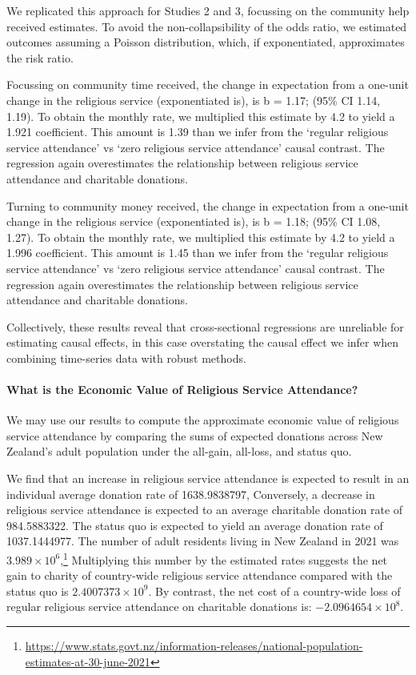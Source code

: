 \documentclass[
  single column]{article}
\let\oldparagraph\paragraph
\renewcommand{\paragraph}[1]{\oldparagraph{#1}\mbox{}}
\begin{document}
We replicated this approach for Studies 2 and 3, focussing on the
community help received estimates. To avoid the non-collapsibility of
the odds ratio, we estimated outcomes assuming a Poisson distribution,
which, if exponentiated, approximates the risk ratio.

Focussing on community time received, the change in expectation from a
one-unit change in the religious service (exponentiated is), is b =
1.17; (95\% CI 1.14, 1.19). To obtain the monthly rate, we multiplied
this estimate by 4.2 to yield a 1.921 coefficient. This amount is 1.39
than we infer from the `regular religious service attendance' vs `zero
religious service attendance' causal contrast. The regression again
overestimates the relationship between religious service attendance and
charitable donations.

Turning to community money received, the change in expectation from a
one-unit change in the religious service (exponentiated is), is b =
1.18; (95\% CI 1.08, 1.27). To obtain the monthly rate, we multiplied
this estimate by 4.2 to yield a 1.996 coefficient. This amount is 1.45
than we infer from the `regular religious service attendance' vs `zero
religious service attendance' causal contrast. The regression again
overestimates the relationship between religious service attendance and
charitable donations.

Collectively, these results reveal that cross-sectional regressions are
unreliable for estimating causal effects, in this case overstating the
causal effect we infer when combining time-series data with robust
methods.

\paragraph{What is the Economic Value of Religious Service
Attendance?}\label{what-is-the-economic-value-of-religious-service-attendance}

We may use our results to compute the approximate economic value of
religious service attendance by comparing the sums of expected donations
across New Zealand's adult population under the all-gain, all-loss, and
status quo.

We find that an increase in religious service attendance is expected to
result in an individual average donation rate of 1638.9838797,
Conversely, a decrease in religious service attendance is expected to an
average charitable donation rate of 984.5883322. The status quo is
expected to yield an average donation rate of 1037.1444977. The number
of adult residents living in New Zealand in 2021 was
\ensuremath{3.989\times 10^{6}},\footnote{\url{https://www.stats.govt.nz/information-releases/national-population-estimates-at-30-june-2021}}
Multiplying this number by the estimated rates suggests the net gain to
charity of country-wide religious service attendance compared with the
status quo is \ensuremath{2.4007373\times 10^{9}}. By contrast, the net
cost of a country-wide loss of regular religious service attendance on
charitable donations is: \ensuremath{-2.0964654\times 10^{8}}.
\end{document}
